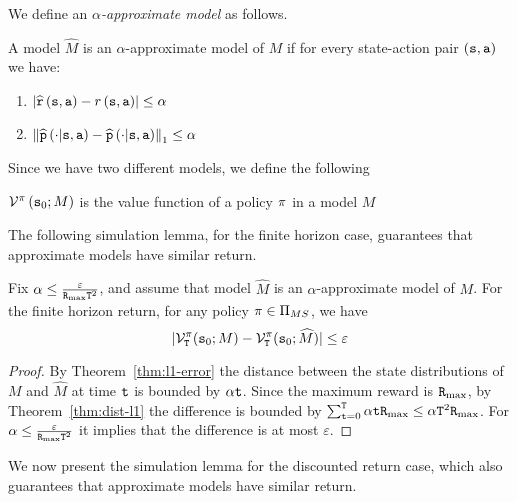 We define an {\em $\alpha$-approximate model} as follows.
%
\begin{definition}
A model $\widehat{M}$ is an $\alpha$-approximate model of $M$ if for
every state-action pair $\left({\tt s},{\tt a}\right)$ we have: 
\begin{enumerate}
	\item $\left|\widehat{{\tt r}}\left({\tt s},{\tt a}\right)-r\left({\tt s},{\tt a}\right)\right|\leq\alpha$
	\item $\left\Vert \widehat{{\tt p}}\left(\cdot|{\tt s},{\tt a}\right)-\widehat{{\tt p}}\left(\cdot|{\tt s},{\tt a}\right)\right\Vert _{1}\leq\alpha$
\end{enumerate}
\end{definition}

Since we have two different models, we define the following
\begin{definition}
$\mathcal{V}^{\pi}\left({\tt s}_{0};M\right)$ is the value function of
a policy $\pi$ in a model $M$ 
\end{definition}

The following simulation lemma, for the finite horizon case,
guarantees that approximate models have similar return.

\begin{lemma}
\label{lemma:approx-model-FH}
%
%
Fix $\alpha\leq \frac{\varepsilon}{{\tt R}_{\max } {\tt T}^2}$, and
assume that model $\widehat{M}$ is an $\alpha$-approximate model of
$M$. For the finite horizon return, for any policy $\pi \in
 {\Pi _{MS}}$, we have
\[
|\mathcal{V}^\pi_{\tt T}({\tt s}_0;M)-\mathcal{V}^\pi_{\tt T}({\tt s}_0;\widehat{M})|\leq
\varepsilon
\]
\end{lemma}

\begin{proof}
By Theorem~\ref{thm:l1-error} the distance between the state
distributions of $M$ and $\widehat{M}$ at time ${\tt t}$ is bounded
by $\alpha{\tt t}$. Since the maximum reward  is ${\tt R}_{\max }$, by
Theorem~\ref{thm:dist-l1} the difference is bounded by
$\sum_{{\tt t}=0}^{\tt T} \alpha{\tt t} {\tt R}_{\max }\leq \alpha{\tt T}^2
{\tt R}_{\max }$. For $\alpha\leq \frac{\varepsilon}{{\tt R}_{\max } {\tt T}^2}$ it
implies that the difference is at most $\varepsilon$.
\end{proof}


We now present the simulation lemma for the discounted return
case, which also guarantees that approximate models have similar
return.

